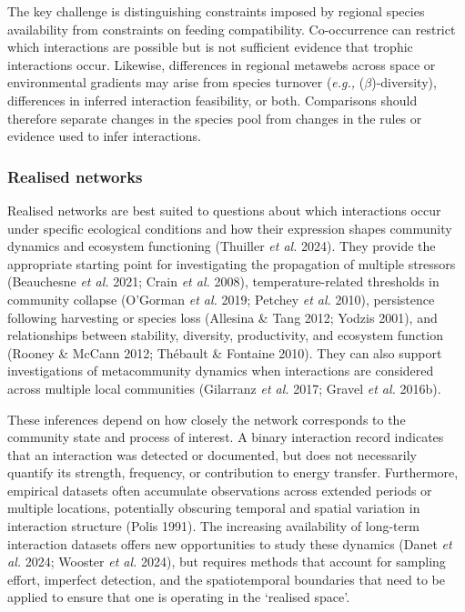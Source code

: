 \documentclass[
]{article}
\begin{document}
The key challenge is distinguishing constraints imposed by regional
species availability from constraints on feeding compatibility.
Co-occurrence can restrict which interactions are possible but is not
sufficient evidence that trophic interactions occur. Likewise,
differences in regional metawebs across space or environmental gradients
may arise from species turnover (\emph{e.g.,} (\(\beta\))-diversity),
differences in inferred interaction feasibility, or both. Comparisons
should therefore separate changes in the species pool from changes in
the rules or evidence used to infer interactions.

\subsubsection{Realised networks}\label{realised-networks}

Realised networks are best suited to questions about which interactions
occur under specific ecological conditions and how their expression
shapes community dynamics and ecosystem functioning (Thuiller \emph{et
al.} 2024). They provide the appropriate starting point for
investigating the propagation of multiple stressors (Beauchesne \emph{et
al.} 2021; Crain \emph{et al.} 2008), temperature-related thresholds in
community collapse (O'Gorman \emph{et al.} 2019; Petchey \emph{et al.}
2010), persistence following harvesting or species loss (Allesina \&
Tang 2012; Yodzis 2001), and relationships between stability, diversity,
productivity, and ecosystem function (Rooney \& McCann 2012; Thébault \&
Fontaine 2010). They can also support investigations of metacommunity
dynamics when interactions are considered across multiple local
communities (Gilarranz \emph{et al.} 2017; Gravel \emph{et al.} 2016b).

These inferences depend on how closely the network corresponds to the
community state and process of interest. A binary interaction record
indicates that an interaction was detected or documented, but does not
necessarily quantify its strength, frequency, or contribution to energy
transfer. Furthermore, empirical datasets often accumulate observations
across extended periods or multiple locations, potentially obscuring
temporal and spatial variation in interaction structure (Polis 1991).
The increasing availability of long-term interaction datasets offers new
opportunities to study these dynamics (Danet \emph{et al.} 2024; Wooster
\emph{et al.} 2024), but requires methods that account for sampling
effort, imperfect detection, and the spatiotemporal boundaries that need
to be applied to ensure that one is operating in the `realised space'.
\end{document}
